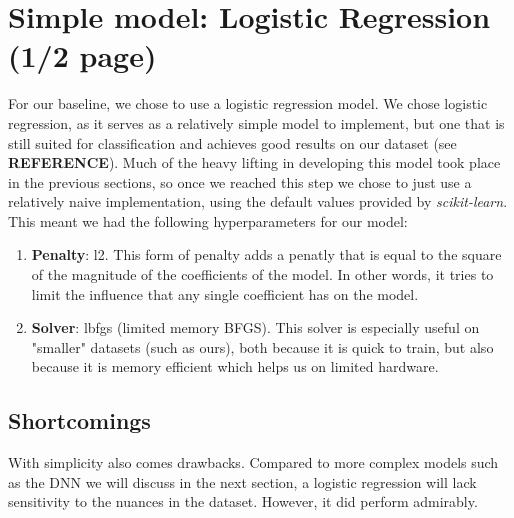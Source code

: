 \section{Simple model: Logistic Regression (1/2 page)} 
For our baseline, we chose to use a logistic regression model. We chose logistic regression, as it serves as a
relatively simple model to implement, but one that is still suited for classification and achieves good results on our
dataset (see \textbf{REFERENCE}). Much of the heavy lifting in developing this model took place in the previous sections,
so once we reached this step we chose to just use a relatively naive implementation, using the default values provided
by \textit{scikit-learn}. This meant we had the following hyperparameters for our model:

\begin{enumerate}
  \item \textbf{Penalty}: l2. This form of penalty adds a penatly that is equal to the square of the magnitude of the
    coefficients of the model. In other words, it tries to limit the influence that any single coefficient has on the
    model.

  \item \textbf{Solver}: lbfgs (limited memory BFGS). This solver is especially useful on "smaller" datasets (such as
    ours), both because it is quick to train, but also because it is memory efficient which helps us on limited
    hardware.

\end{enumerate}

\subsection{Shortcomings}
With simplicity also comes drawbacks. Compared to more complex models such as the DNN we will discuss in the next
section, a logistic regression will lack sensitivity to the nuances in the dataset. However, it did perform admirably.


